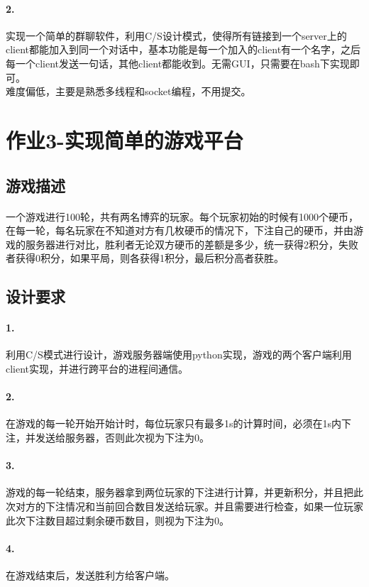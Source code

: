 \documentclass[12pt]{article}
\begin{document}
\begin{CJK}{UTF8}{gbsn}
\paragraph{2.}实现一个简单的群聊软件，利用C/S设计模式，使得所有链接到一个server上的client都能加入到同一个对话中，基本功能是每一个加入的client有一个名字，之后每一个client发送一句话，其他client都能收到。无需GUI，只需要在bash下实现即可。
\\难度偏低，主要是熟悉多线程和socket编程，不用提交。
\section{作业3-实现简单的游戏平台}
\subsection{游戏描述}
\paragraph{}一个游戏进行100轮，共有两名博弈的玩家。每个玩家初始的时候有1000个硬币，在每一轮，每名玩家在不知道对方有几枚硬币的情况下，下注自己的硬币，并由游戏的服务器进行对比，胜利者无论双方硬币的差额是多少，统一获得2积分，失败者获得0积分，如果平局，则各获得1积分，最后积分高者获胜。
\subsection{设计要求}
\paragraph{1.}利用C/S模式进行设计，游戏服务器端使用python实现，游戏的两个客户端利用client实现，并进行跨平台的进程间通信。
\paragraph{2.}在游戏的每一轮开始开始计时，每位玩家只有最多1s的计算时间，必须在1s内下注，并发送给服务器，否则此次视为下注为0。
\paragraph{3.}游戏的每一轮结束，服务器拿到两位玩家的下注进行计算，并更新积分，并且把此次对方的下注情况和当前回合数目发送给玩家。并且需要进行检查，如果一位玩家此次下注数目超过剩余硬币数目，则视为下注为0。
\paragraph{4.}在游戏结束后，发送胜利方给客户端。

\end{CJK}
\end{document}
